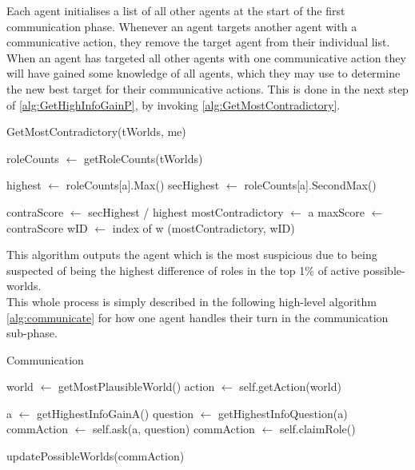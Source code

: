 \setcounter{algorithmcaption}{3}
Each agent initialises a list of all other agents at the
start of the first communication phase. Whenever an agent targets another agent
with a communicative action, they remove the target agent from their individual
list. When an agent has targeted all other agents with one communicative action
they will have gained some knowledge of all agents, which they may use to determine
the new best target for their communicative
actions. This is done in the next step of \cref{alg:GetHighInfoGainP},
by invoking \cref{alg:GetMostContradictory}.
\begin{algorithm}[H]
	\caption{GetMostContradictory(tWorlds, me)}
	\begin{algorithmic}
		\State roleCounts $\gets$ getRoleCounts(tWorlds)

		\State highest $\gets$ roleCounts[a].Max()
		\State secHighest $\gets$ roleCounts[a].SecondMax()

		\State contraScore $\gets$ secHighest / highest
		\State mostContradictory $\gets$ a
		\State maxScore $\gets$ contraScore
		\State wID $\gets$ index of w
		\EndIf
		\EndFor
		\EndFor
		\State \Return (mostContradictory, wID)
	\end{algorithmic}\label{alg:GetMostContradictory}
\end{algorithm}
\setcounter{algorithmcaption}{4}
This algorithm outputs the agent which is the most suspicious due to being
suspected of being the highest difference of roles in the top 1\% of active possible-worlds.\\
This whole process is simply described in the following high-level algorithm
\ref{alg:communicate} for how one agent handles their turn in the communication
sub-phase.
\begin{algorithm}[H]
	\caption{Communication}
	\begin{algorithmic}[1]
		\State world $\gets$ getMostPlausibleWorld()
		\State action $\gets$ self.getAction(world)

		\State a $\gets$ getHighestInfoGainA()
		\State question $\gets$ getHighestInfoQuestion(a)
		\State commAction $\gets$ self.ask(a, question)
		\State commAction $\gets$ self.claimRole()
		\EndIf

		\State updatePossibleWorlds(commAction)
		\EndFunction
	\end{algorithmic}\label{alg:communicate}
\end{algorithm}
